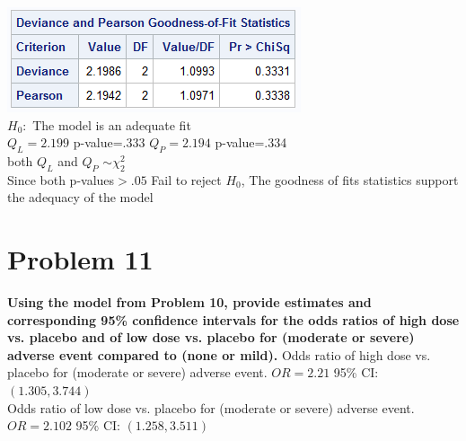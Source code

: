 \documentclass{article}
\begin{document}
\begin{flushleft}
\includegraphics[scale=.6]{gof10.png}\\
$H_0:$ The model is an adequate fit\\
$Q_L=2.199$ p-value=.333 $Q_P=2.194$ p-value=.334\\
both $ Q_L$ and $Q_P$ $\sim \chi^2_{2}$\\
Since both p-values$>.05$ Fail to reject $H_0$, The goodness of fits statistics support the adequacy of the model
\pagebreak
\section*{Problem 11}
\textbf{Using the model from Problem 10, provide estimates and corresponding 95\% confidence intervals
for the odds ratios of high dose vs. placebo and of low dose vs. placebo for (moderate or severe)
adverse event compared to (none or mild).}\medbreak
Odds ratio of high dose vs. placebo for (moderate or severe)
adverse event. $OR=2.21$ 95\% CI: $(1.305,3.744)$\\
Odds ratio of low dose vs. placebo for (moderate or severe)
adverse event. $OR=2.102$ 95\% CI: $(1.258, 3.511)$\\ 
\pagebreak

\end{flushleft}
\end{document}
